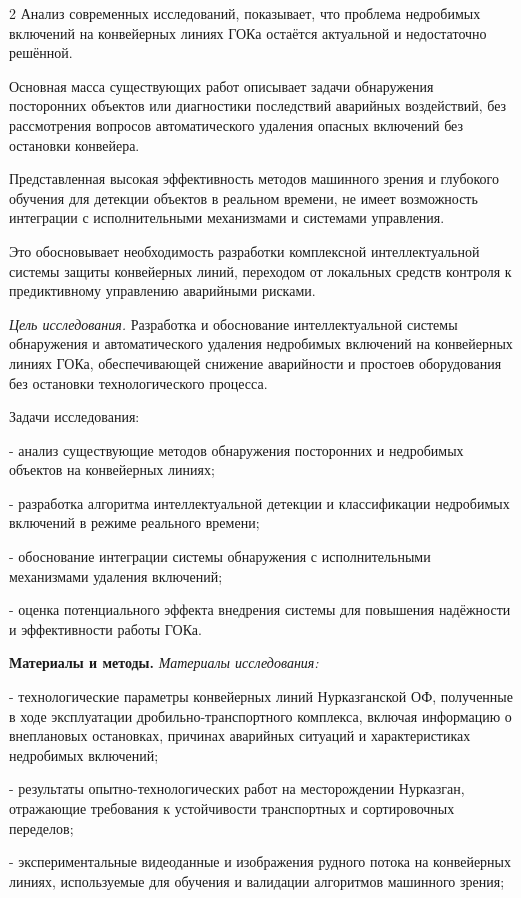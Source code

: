 \begin{multicols}{2}
Анализ современных исследований, показывает, что проблема недробимых
включений на конвейерных линиях ГОКа остаётся актуальной и недостаточно
решённой.

Основная масса существующих работ описывает задачи обнаружения
посторонних объектов или диагностики последствий аварийных воздействий,
без рассмотрения вопросов автоматического удаления опасных включений без
остановки конвейера.

Представленная высокая эффективность методов машинного зрения и
глубокого обучения для детекции объектов в реальном времени, не имеет
возможность интеграции с исполнительными механизмами и системами
управления.

Это обосновывает необходимость разработки комплексной интеллектуальной
системы защиты конвейерных линий, переходом от локальных средств
контроля к предиктивному управлению аварийными рисками.

\emph{Цель исследования.} Разработка и обоснование интеллектуальной
системы обнаружения и автоматического удаления недробимых включений на
конвейерных линиях ГОКа, обеспечивающей снижение аварийности и простоев
оборудования без остановки технологического процесса.

Задачи исследования:

- анализ существующие методов обнаружения посторонних и недробимых
объектов на конвейерных линиях;

- разработка алгоритма интеллектуальной детекции и классификации
недробимых включений в режиме реального времени;

- обоснование интеграции системы обнаружения с исполнительными
механизмами удаления включений;

- оценка потенциального эффекта внедрения системы для повышения
надёжности и эффективности работы ГОКа.

{\bfseries Материалы и методы.} \emph{Материалы исследования:}

- технологические параметры конвейерных линий Нурказганской ОФ,
полученные в ходе эксплуатации дробильно-транспортного комплекса,
включая информацию о внеплановых остановках, причинах аварийных ситуаций
и характеристиках недробимых включений;

- результаты опытно-технологических работ на месторождении
Нурказган, отражающие требования к устойчивости транспортных и
сортировочных переделов;

- экспериментальные видеоданные и изображения рудного потока на
конвейерных линиях, используемые для обучения и валидации алгоритмов
машинного зрения;


\end{multicols}
